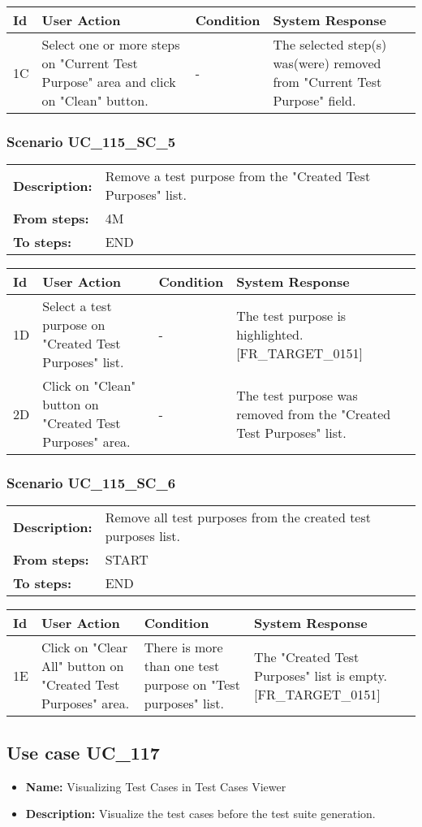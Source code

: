 \documentclass[a4paper,11pt]{article}
\newcommand{\bl}{\\ \hline}
\begin{document}
\begin{tabular}{|p{0.8in}|p{1.6in}|p{1.6in}|p{1.6in}|}
\hline
Id & User Action & Condition & System Response  \bl 
1C & Select one or more steps on "Current Test Purpose" area and click on "Clean" button. & - & The selected step(s) was(were) removed from "Current Test Purpose" field. \bl 
\end{tabular}
\subsubsection*{Scenario UC_115_SC_5}
\begin{tabular}{p{1in}p{4in}}
{\bf Description:} & Remove a test purpose from the "Created Test Purposes" list. \\
{\bf From steps:} & 4M \\
{\bf To steps:} & END \\
\end{tabular}
 
\begin{tabular}{|p{0.8in}|p{1.6in}|p{1.6in}|p{1.6in}|}
\hline
Id & User Action & Condition & System Response  \bl 
1D & Select a test purpose on "Created Test Purposes" list. & - & The test purpose is highlighted. [FR_TARGET_0151] \bl 
2D & Click on "Clean" button on "Created Test Purposes" area. & - & The test purpose was removed from the "Created Test Purposes" list. \bl 
\end{tabular}
\subsubsection*{Scenario UC_115_SC_6}
\begin{tabular}{p{1in}p{4in}}
{\bf Description:} & Remove all test purposes from the created test purposes list. \\
{\bf From steps:} & START \\
{\bf To steps:} & END \\
\end{tabular}
 
\begin{tabular}{|p{0.8in}|p{1.6in}|p{1.6in}|p{1.6in}|}
\hline
Id & User Action & Condition & System Response  \bl 
1E & Click on "Clear All" button on "Created Test Purposes" area. & There is more than one test purpose on "Test purposes" list. & The "Created Test Purposes" list is empty. [FR_TARGET_0151] \bl 
\end{tabular}
\subsection*{Use case UC_117}
\begin{itemize}
\item {\bf Name: }Visualizing Test Cases in Test Cases Viewer
\item {\bf Description: }Visualize the test cases before the test suite generation.
\end{itemize}
\end{document}
